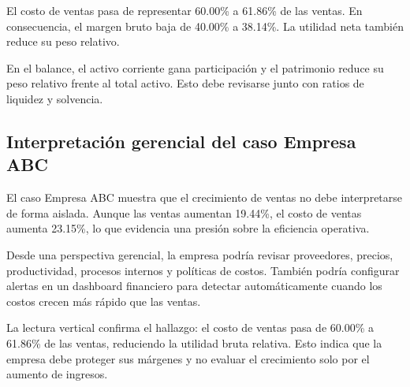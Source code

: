 El costo de ventas pasa de representar 60.00\% a 61.86\% de las ventas. En consecuencia, el margen bruto baja de 40.00\% a 38.14\%. La utilidad neta también reduce su peso relativo.

En el balance, el activo corriente gana participación y el patrimonio reduce su peso relativo frente al total activo. Esto debe revisarse junto con ratios de liquidez y solvencia.

\subsection{Interpretación gerencial del caso Empresa ABC}

El caso Empresa ABC muestra que el crecimiento de ventas no debe interpretarse de forma aislada. Aunque las ventas aumentan 19.44\%, el costo de ventas aumenta 23.15\%, lo que evidencia una presión sobre la eficiencia operativa.

Desde una perspectiva gerencial, la empresa podría revisar proveedores, precios, productividad, procesos internos y políticas de costos. También podría configurar alertas en un dashboard financiero para detectar automáticamente cuando los costos crecen más rápido que las ventas.

La lectura vertical confirma el hallazgo: el costo de ventas pasa de 60.00\% a 61.86\% de las ventas, reduciendo la utilidad bruta relativa. Esto indica que la empresa debe proteger sus márgenes y no evaluar el crecimiento solo por el aumento de ingresos.
